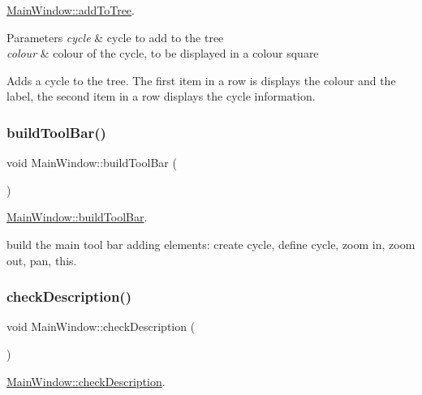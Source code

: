 \mbox{\hyperlink{class_main_window_a816f983db7e31a8a3e8376538b44804f}{Main\+Window\+::add\+To\+Tree}}. 


\begin{DoxyParams}{Parameters}
{\em cycle} & cycle to add to the tree \\
\hline
{\em colour} & colour of the cycle, to be displayed in a colour square\\
\hline
\end{DoxyParams}
Adds a cycle to the tree. The first item in a row is displays the colour and the label, the second item in a row displays the cycle information. \mbox{\label{class_main_window_a2e45b04e116068ed411c9738fbdc71ff}} 
\subsubsection{\texorpdfstring{build\+Tool\+Bar()}{buildToolBar()}}
{\footnotesize\ttfamily void Main\+Window\+::build\+Tool\+Bar (\begin{DoxyParamCaption}{ }\end{DoxyParamCaption})}



\mbox{\hyperlink{class_main_window_a2e45b04e116068ed411c9738fbdc71ff}{Main\+Window\+::build\+Tool\+Bar}}. 

build the main tool bar adding elements\+: create cycle, define cycle, zoom in, zoom out, pan, \textquotesingle{}this\textquotesingle{}. \mbox{\label{class_main_window_a3e72a214988b3628c36ad4f3e41dc0af}} 
\subsubsection{\texorpdfstring{check\+Description()}{checkDescription()}}
{\footnotesize\ttfamily void Main\+Window\+::check\+Description (\begin{DoxyParamCaption}{ }\end{DoxyParamCaption})}



\mbox{\hyperlink{class_main_window_a3e72a214988b3628c36ad4f3e41dc0af}{Main\+Window\+::check\+Description}}. 

